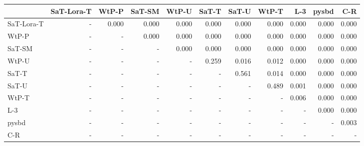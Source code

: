 \begin{tabular}{lrrrrrrrrrr}
\toprule
 & SaT-Lora-T & WtP-P & SaT-SM & WtP-U & SaT-T & SaT-U & WtP-T & L-3 & pysbd & C-R \\
\midrule
SaT-Lora-T & - & 0.000 & 0.000 & 0.000 & 0.000 & 0.000 & 0.000 & 0.000 & 0.000 & 0.000 \\
WtP-P & - & - & 0.000 & 0.000 & 0.000 & 0.000 & 0.000 & 0.000 & 0.000 & 0.000 \\
SaT-SM & - & - & - & 0.000 & 0.000 & 0.000 & 0.000 & 0.000 & 0.000 & 0.000 \\
WtP-U & - & - & - & - & 0.259 & 0.016 & 0.012 & 0.000 & 0.000 & 0.000 \\
SaT-T & - & - & - & - & - & 0.561 & 0.014 & 0.000 & 0.000 & 0.000 \\
SaT-U & - & - & - & - & - & - & 0.489 & 0.001 & 0.000 & 0.000 \\
WtP-T & - & - & - & - & - & - & - & 0.006 & 0.000 & 0.000 \\
L-3 & - & - & - & - & - & - & - & - & 0.000 & 0.000 \\
pysbd & - & - & - & - & - & - & - & - & - & 0.003 \\
C-R & - & - & - & - & - & - & - & - & - & - \\
\bottomrule
\end{tabular}


